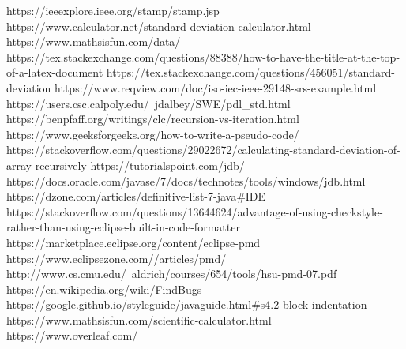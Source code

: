 \documentclass[a4paper,12pt]{article}
\begin{document}
\begin{titlepage}
https://ieeexplore.ieee.org/stamp/stamp.jsp\newline
https://www.calculator.net/standard-deviation-calculator.html\newline
https://www.mathsisfun.com/data/\newline
https://tex.stackexchange.com/questions/88388/how-to-have-the-title-at-the-top-of-a-latex-document\newline
https://tex.stackexchange.com/questions/456051/standard-deviation\newline
https://www.reqview.com/doc/iso-iec-ieee-29148-srs-example.html\newline
https://users.csc.calpoly.edu/~jdalbey/SWE/pdl_std.html\newline
https://benpfaff.org/writings/clc/recursion-vs-iteration.html\newline
https://www.geeksforgeeks.org/how-to-write-a-pseudo-code/\newline
https://stackoverflow.com/questions/29022672/calculating-standard-deviation-of-array-recursively\newline
https://tutorialspoint.com/jdb/\newline
https://docs.oracle.com/javase/7/docs/technotes/tools/windows/jdb.html\newline
https://dzone.com/articles/definitive-list-7-java#IDE%
https://stackoverflow.com/questions/13644624/advantage-of-using-checkstyle-rather-than-using-eclipse-built-in-code-formatter\newline
https://marketplace.eclipse.org/content/eclipse-pmd\\
https://www.eclipsezone.com//articles/pmd/\\
http://www.cs.cmu.edu/~aldrich/courses/654/tools/hsu-pmd-07.pdf\\
https://en.wikipedia.org/wiki/FindBugs\\
https://google.github.io/styleguide/javaguide.html#s4.2-block-indentation\\
https://www.mathsisfun.com/scientific-calculator.html\\
https://www.overleaf.com/ \\



\end{titlepage}
\end{document}
